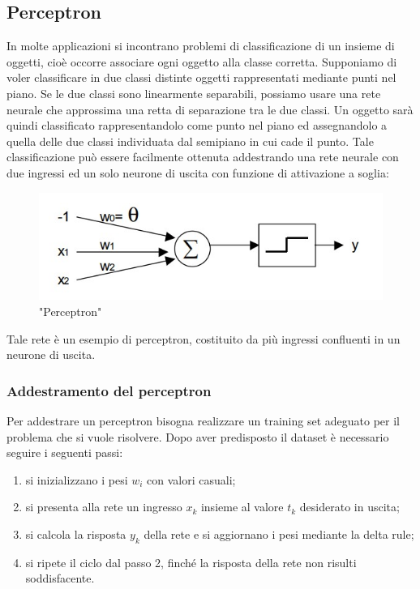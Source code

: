 \documentclass[a4paper,11pt]{article}
\begin{document}
    \subsection{Perceptron}
    In molte applicazioni si incontrano problemi di classificazione di un
    insieme di oggetti, cioè occorre associare ogni oggetto alla classe corretta.
    Supponiamo di voler classificare in due classi distinte oggetti rappresentati
    mediante punti nel piano. Se le due classi sono linearmente separabili,
    possiamo usare una rete neurale che approssima una retta di separazione
    tra le due classi. Un oggetto sarà quindi classificato rappresentandolo
    come punto nel piano ed assegnandolo a quella delle due classi individuata
    dal semipiano in cui cade il punto. 
    Tale classificazione può essere facilmente ottenuta addestrando una rete
    neurale con due ingressi ed un solo neurone di uscita con funzione di
    attivazione a soglia:
    \begin{figure}[h]
        \centering
        \includegraphics{perceptron.jpg}
        \caption{"Perceptron"}
    \end{figure}
    Tale rete è un esempio di perceptron, costituito da più ingressi confluenti in un neurone di uscita.

    \subsubsection{Addestramento del perceptron}
    Per addestrare un perceptron bisogna realizzare un training set adeguato per il problema che si vuole risolvere. 
    Dopo aver predisposto il dataset è necessario seguire i seguenti passi:
    \begin{enumerate}
        \item si inizializzano i pesi $w_i$ con valori casuali;
        \item si presenta alla rete un ingresso $x_k$ insieme al valore $t_k$ desiderato in uscita;
        \item si calcola la risposta $y_k$ della rete e si aggiornano i pesi mediante la delta rule;
        \item si ripete il ciclo dal passo 2, finché la risposta della rete non risulti soddisfacente.
    \end{enumerate}
\end{document}
